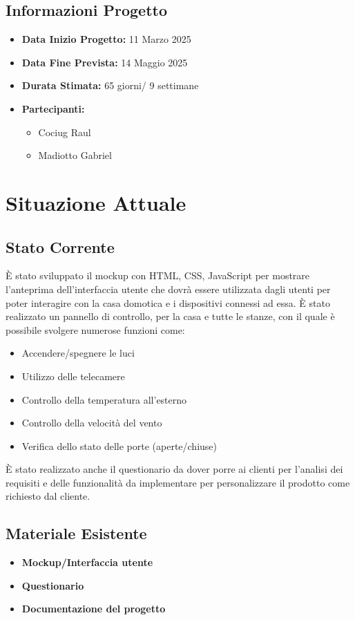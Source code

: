 \documentclass[a4paper,12pt]{article}
\begin{document}
\subsection{Informazioni Progetto}
\begin{itemize}
    \item \textbf{Data Inizio Progetto:} 11 Marzo 2025
    \item \textbf{Data Fine Prevista:} 14 Maggio 2025
    \item \textbf{Durata Stimata:} 65 giorni/ 9 settimane
    \item \textbf{Partecipanti:}
    \begin{itemize}
        \item Cociug Raul
        \item Madiotto Gabriel
    \end{itemize}
\end{itemize}

\section{Situazione Attuale}
\subsection{Stato Corrente}
È stato sviluppato il mockup con HTML, CSS, JavaScript per mostrare l'anteprima dell'interfaccia utente che dovrà essere utilizzata dagli utenti per poter interagire con la casa domotica e i dispositivi connessi ad essa.
È stato realizzato un pannello di controllo, per la casa e tutte le stanze, con il quale è possibile svolgere numerose funzioni come:\begin{itemize}
\item Accendere/spegnere le luci
\item Utilizzo delle telecamere
\item Controllo della temperatura all'esterno
\item Controllo della velocità del vento
\item Verifica dello stato delle porte (aperte/chiuse)
\end{itemize}
È stato realizzato anche il questionario da dover porre ai clienti per l'analisi dei requisiti e delle funzionalità da implementare per personalizzare il prodotto come richiesto dal cliente.

\subsection{Materiale Esistente}
\begin{itemize}
\item \textbf{Mockup/Interfaccia utente}
\item \textbf{Questionario}
\item \textbf{Documentazione del progetto}
\end{itemize}
\end{document}
